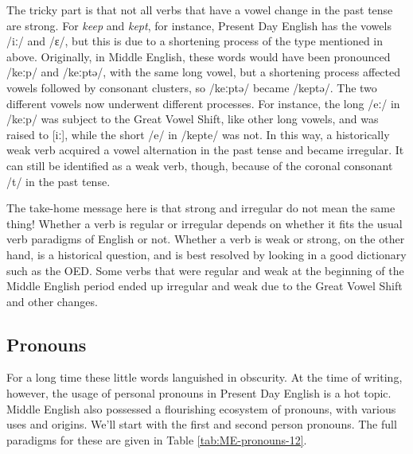 The tricky part is that not all verbs that have a vowel change in the past tense are strong. For \textit{keep} and \textit{kept}, for instance, Present Day English has the vowels /iː/ and /ɛ/, but this is due to a shortening process of the type mentioned in  above. Originally, in Middle English, these words would have been pronounced /keːp/ and /keːptə/, with the same long vowel, but a shortening process affected vowels followed by consonant clusters, so /keːptə/ became /keptə/. The two different vowels now underwent different processes. For instance, the long /eː/ in /keːp/ was subject to the Great Vowel Shift, like other long vowels, and was raised to [iː], while the short /e/ in /kepte/ was not. In this way, a historically weak verb acquired a vowel alternation in the past tense and became irregular. It can still be identified as a weak verb, though, because of the coronal consonant /t/ in the past tense.

The take-home message here is that strong and irregular do not mean the same thing! Whether a verb is regular or irregular depends on whether it fits the usual verb paradigms of English or not. Whether a verb is weak or strong, on the other hand, is a historical question, and is best resolved by looking in a good dictionary such as the OED. Some verbs that were regular and weak at the beginning of the Middle English period ended up irregular and weak due to the Great Vowel Shift and other changes.

\subsection{Pronouns}\label{ME-pronouns}
For a long time these little words languished in obscurity. At the time of writing, however, the usage of personal pronouns in Present Day English is a hot topic. Middle English also possessed a flourishing ecosystem of pronouns, with various uses and origins. We'll start with the first and second person pronouns. The full paradigms for these are given in Table \ref{tab:ME-pronouns-12}.

